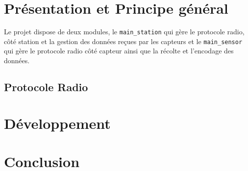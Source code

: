 \documentclass[a4paper]{article}
\begin{document}
\section{Présentation et Principe général}

Le projet dispose de deux modules, le \texttt{main\_station} qui gère le protocole radio, côté station et 
la gestion des données reçues par les capteurs et le \texttt{main\_sensor} qui gère le protocole radio côté 
capteur ainsi que la récolte et l'encodage des données. 

\subsection{Protocole Radio}





\section{Développement}








\section{Conclusion}
\end{document}
